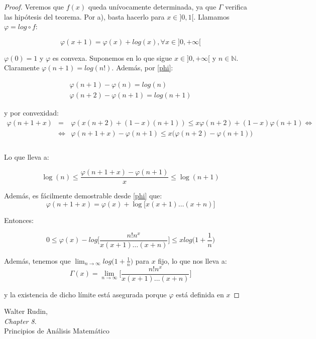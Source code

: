 \documentclass[a4paper, 11pt]{amsart}
\theoremstyle{definition}
\theoremstyle{remark}
\numberwithin{equation}{section}
\begin{document}
  \begin{proof}
   Veremos que $f(x)$ queda unívocamente determinada, ya que $\Gamma$ verifica las hipótesis del teorema.
   Por a), basta hacerlo para $x\in]0,1[$. Llamamos $\varphi = log \circ f$:
   
   \begin{equation}
    \varphi (x+1) = \varphi(x) + log(x), \forall x\in]0,+\infty[
    \label{phi}
   \end{equation}
   
   $\varphi(0) = 1$ y $\varphi$ es convexa. Suponemos en lo que sigue $ x\in]0,+\infty[$ y $n\in \mathbb{N}$.
   Claramente $\varphi(n+1) = log(n!)$. Además, por \ref{phi}:
   
   \begin{eqnarray*}
    \varphi(n+1)-\varphi(n) = log(n)\\
    \varphi(n+2)-\varphi(n+1) = log(n+1)
   \end{eqnarray*}
   
   y por convexidad:
   \begin{eqnarray*}
    \varphi (n+1+x) &=& \varphi(x(n+2) +(1-x)(n+1)) \le x\varphi(n+2) + (1-x)\varphi(n+1) \Leftrightarrow\\
    &\Leftrightarrow& \varphi (n+1+x) - \varphi(n+1) \le x\big(\varphi(n+2)-\varphi(n+1)\big)\\
    \\\
   \end{eqnarray*}
   
   Lo que lleva a:
   
   $$\log(n) \le \frac{\varphi(n+1+x)-\varphi(n+1)}{x} \le \log(n+1)$$
   
   Además, es fácilmente demostrable desde \ref{phi} que:
   \begin{equation}
    \varphi(n+1+x) = \varphi(x) + \log\big[x(x+1)\ldots(x+n)\big]
   \end{equation}
   
   Entonces:
   
   $$0\le \varphi(x) - log \bigg[\frac{n!n^x}{x(x+1)\ldots (x+n)}\bigg] \le xlog\bigg(1+\frac{1}{n}\bigg)$$
   
   Además, tenemos que $\lim_{n\rightarrow \infty} log\bigg(1+\frac{1}{n}\bigg)$ para $x$ fijo, lo que nos lleva a:\\
   
   $$\Gamma(x) = \lim_{n\rightarrow \infty} \bigg[\frac{n!n^x}{x(x+1)\ldots (x+n)}\bigg] $$
   
   y la existencia de dicho límite está asegurada porque $\varphi$ está definida en $x$



  \end{proof}


  
  \vfill
  \begin{thebibliography}{9}

    Walter Rudin,\\
    \emph{Chapter 8}.\\
    Principios de Análisis Matemático
    
  \end{thebibliography}

  
\end{document}
